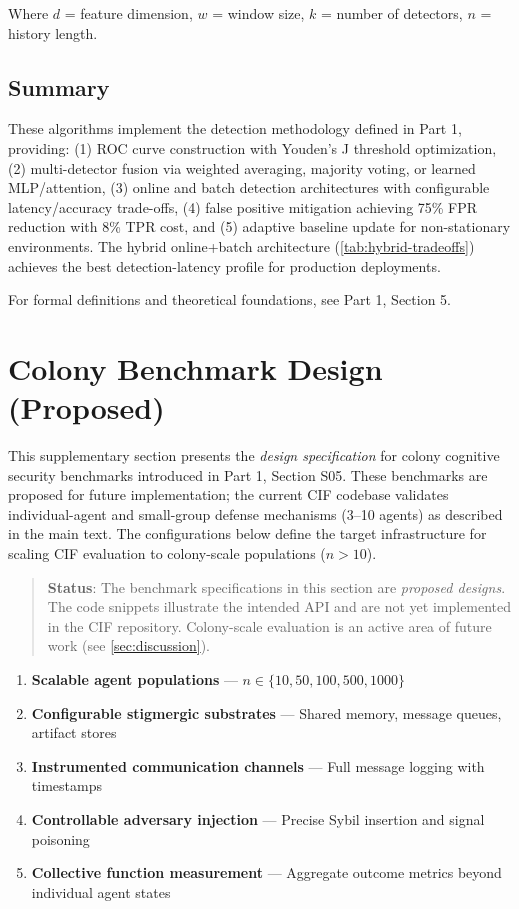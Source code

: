 \documentclass[
]{article}
\providecommand{\tightlist}{%
  \setlength{\itemsep}{0pt}\setlength{\parskip}{0pt}}
\begin{document}
Where \(d\) = feature dimension, \(w\) = window size, \(k\) = number of
detectors, \(n\) = history length.

\subsection{Summary}\label{summary}

These algorithms implement the detection methodology defined in Part 1,
providing: (1) ROC curve construction with Youden's J threshold
optimization, (2) multi-detector fusion via weighted averaging, majority
voting, or learned MLP/attention, (3) online and batch detection
architectures with configurable latency/accuracy trade-offs, (4) false
positive mitigation achieving 75\% FPR reduction with 8\% TPR cost, and
(5) adaptive baseline update for non-stationary environments. The hybrid
online+batch architecture (\cref{tab:hybrid-tradeoffs}) achieves the
best detection-latency profile for production deployments.

For formal definitions and theoretical foundations, see Part 1, Section
5.

\newpage

\newpage

\section{Colony Benchmark Design
(Proposed)}\label{sec:benchmark-implementation}

This supplementary section presents the \emph{design specification} for
colony cognitive security benchmarks introduced in Part 1, Section S05.
These benchmarks are proposed for future implementation; the current CIF
codebase validates individual-agent and small-group defense mechanisms
(3--10 agents) as described in the main text. The configurations below
define the target infrastructure for scaling CIF evaluation to
colony-scale populations (\(n > 10\)).

\begin{quote}
\textbf{Status}: The benchmark specifications in this section are
\emph{proposed designs}. The code snippets illustrate the intended API
and are not yet implemented in the CIF repository. Colony-scale
evaluation is an active area of future work (see \cref{sec:discussion}).
\end{quote}

\begin{enumerate}
\def\labelenumi{\arabic{enumi}.}
\tightlist
\item
  \textbf{Scalable agent populations} ---
  \(n \in \{10, 50, 100, 500, 1000\}\)
\item
  \textbf{Configurable stigmergic substrates} --- Shared memory, message
  queues, artifact stores
\item
  \textbf{Instrumented communication channels} --- Full message logging
  with timestamps
\item
  \textbf{Controllable adversary injection} --- Precise Sybil insertion
  and signal poisoning
\item
  \textbf{Collective function measurement} --- Aggregate outcome metrics
  beyond individual agent states
\end{enumerate}
\end{document}
